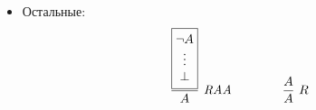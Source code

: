 \documentclass[10pt,a4paper]{article}
\DeclareRobustCommand{\rvdots}{%
    \vphantom{\int\limits^x}\smash[t]{\vdots}
}
\begin{document}
\begin{itemize}
\[{{\begin{matrix}
            B
    \end{matrix}}}{A \lor B}\ \lor I'
    \qquad 
    \frac{\boxed{\begin{matrix}
            \neg B \\
            \rvdots \\
            A
    \end{matrix}}}{A \lor B}\ \lor I'
    \]
    \item Остальные:
    \[
    \frac{\boxed{\begin{matrix}
            \neg A \\
            \rvdots \\
            \bot
    \end{matrix}}}{A}\ \mathit{RAA}
    \qquad \qquad 
    \frac{A}{A}\ R
    \]
\end{itemize}
\end{document}
